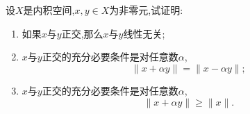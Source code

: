 \documentclass[lang = cn, scheme = chinese]{elegantbook}
\begin{document}
	\chapter{}
	
	\begin{proposition}{2.1}
		设$X$是内积空间,$x,y\in X$为非零元,试证明:
		\begin{enumerate}
			\item 如果$x$与$y$正交,那么$x$与$y$线性无关;
			\item $x$与$y$正交的充分必要条件是对任意数$\alpha$,
			$$
			\|x+\alpha y\|=\|x-\alpha y\|;
			$$
			\item $x$与$y$正交的充分必要条件是对任意数$\alpha$,
			$$
			\|x+\alpha y\|\ge\|x\|.
			$$
		\end{enumerate}
	\end{proposition}
	
\end{document}
